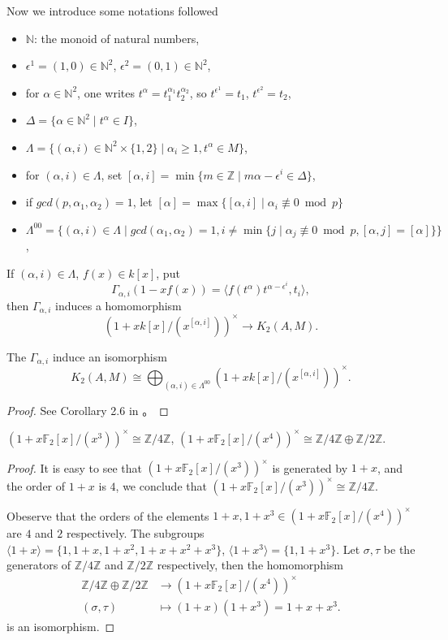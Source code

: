 Now we introduce some notations followed \cite{MR86f:18017}
\begin{itemize}
	\item $\mathbb{N}$: the monoid of natural numbers, 
	\item $\epsilon^1 = (1,0)\in \mathbb{N}^2$, $\epsilon^2 = (0,1)\in \mathbb{N}^2$,
	\item for $\alpha \in \mathbb{N}^2$, one writes $t^{\alpha}=t_1^{\alpha_1}t_2^{\alpha_2}$, so $t^{\epsilon^1}=t_1$, $t^{\epsilon^2}=t_2$,
	\item $\Delta=\{\alpha\in\mathbb{N}^2\mid  t^{\alpha}\in I\}$,
	\item $\Lambda=\{(\alpha,i)\in\mathbb{N}^2 \times \{1,2\}\mid  \alpha_i\geq 1, t^{\alpha}\in M\}$,
	\item for $(\alpha,i)\in\Lambda$, set $[\alpha,i]=\min\{m\in \mathbb{Z}\mid m\alpha - \epsilon^i\in \Delta\}$,
	\item if $gcd(p,\alpha_1,\alpha_2)=1$, let $[\alpha]=\max\{[\alpha,i]\mid  \alpha_i  \not\equiv 0 \bmod p\}$
	\item $\Lambda^{00}= \big\{(\alpha,i)\in \Lambda\mid  gcd(\alpha_1,\alpha_2)=1, i\neq \min\{j\mid \alpha_j\not\equiv 0 \bmod p, [\alpha,j]=[\alpha]\} \big\}$,
\end{itemize}

If $(\alpha,i)\in \Lambda$, $f(x)\in k[x]$, put
\[\Gamma_{\alpha,i}(1-xf(x))= \langle f(t^\alpha)t^{\alpha-\epsilon^i},t_i \rangle,\]
then $\Gamma_{\alpha,i}$ induces a homomorphism
\[(1+xk[x]/(x^{[\alpha,i]}))^{\times} \longrightarrow K_2(A,M).\]
\begin{lemma}
\label{K2(A,M)}
	The $\Gamma_{\alpha,i}$ induce an isomorphism
\[ K_2(A,M)\cong \bigoplus_{(\alpha,i)\in\Lambda^{00}}(1+xk[x]/(x^{[\alpha,i]}))^{\times}.\]
\end{lemma}
\begin{proof}
	See Corollary 2.6 in \cite{MR86f:18017}。
\end{proof}

\begin{lemma} 
\label{lem:BW}
	$(1+x\mathbb{F}_2[x]/(x^{3}))^{\times}\cong \mathbb{Z}/4 \mathbb{Z}$, $(1+x\mathbb{F}_2[x]/(x^{4}))^{\times}\cong \mathbb{Z}/4 \mathbb{Z} \oplus\mathbb{Z}/2 \mathbb{Z}$.
\end{lemma}
\begin{proof}
	It is easy to see that $(1+x\mathbb{F}_2[x]/(x^{3}))^{\times}$ is generated by $1+x$, and the order of $ 1+x $ is $4$, we conclude that $(1+x\mathbb{F}_2[x]/(x^{3}))^{\times}\cong \mathbb{Z}/4 \mathbb{Z}$.

	Obeserve that the orders of the elements $1+x,1+x^3\in (1+x \mathbb{F}_2[x]/(x^4))^{\times}$ are $4$ and $2$ respectively. The subgroups $\langle 1+x \rangle = \{1,1+x,1+x^2,1+x+x^2+x^3\}$, $\langle 1+x^3 \rangle = \{1,1+x^3\}$. Let $\sigma,\tau$ be the generators of $\mathbb{Z}/4 \mathbb{Z}$ and $\mathbb{Z}/2 \mathbb{Z}$ respectively, then the homomorphism 
		\begin{align*}
		\mathbb{Z}/4 \mathbb{Z} \oplus \mathbb{Z}/2 \mathbb{Z} &\longrightarrow (1+x\mathbb{F}_2[x]/(x^{4}))^{\times} \\
		(\sigma,\tau) & \mapsto (1+x)(1+x^3)=1+x+x^3.
		\end{align*}
	is an isomorphism.
\end{proof}
